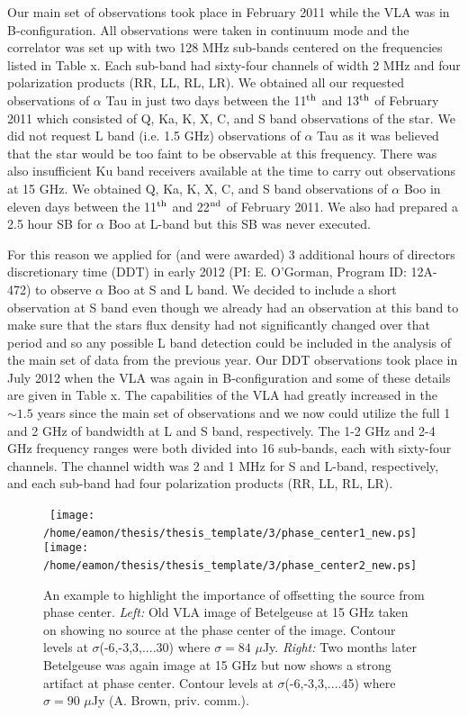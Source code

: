 Our main set of observations took place in February 2011 while the VLA was in B-configuration. All observations were taken in continuum mode and the correlator was set up with two 128 MHz sub-bands centered on the frequencies listed in Table x. Each sub-band had sixty-four channels of width 2 MHz and four polarization products (RR, LL, RL, LR). We obtained all our requested observations of $\alpha$ Tau in just two days between the 11$^{\rm{th}}$ and 13$^{\rm{th}}$ of February 2011 which consisted of Q, Ka, K, X, C, and S band observations of the star. We did not request L band (i.e. 1.5 GHz) observations of $\alpha$ Tau as it was believed that the star would be too faint to be observable at this frequency. There was also insufficient Ku band receivers available at the time to carry out observations at 15 GHz. We obtained Q, Ka, K, X, C, and S band observations of $\alpha$ Boo in eleven days between the 11$^{\rm{th}}$ and 22$^{\rm{nd}}$ of February 2011. We also had prepared a 2.5 hour SB for $\alpha$ Boo at L-band but this SB was never executed. 

For this reason we applied for (and were awarded) 3 additional hours of directors discretionary time (DDT) in early 2012 (PI: E. O'Gorman, Program ID: 12A-472) to observe $\alpha$ Boo at S and L band. We decided to include a short observation at S band even though we already had an observation at this band to make sure that the stars flux density had not significantly changed over that period and so any possible L band detection could be included in the analysis of the main set of data from the previous year. Our DDT observations took place in July 2012 when the VLA was again in B-configuration and some of these details are given in Table x. The capabilities of the VLA had greatly increased in the $\sim 1.5$ years since the main set of observations and we now could utilize the full 1 and 2 GHz of bandwidth at L and S band, respectively. The 1-2 GHz and 2-4 GHz frequency ranges were both divided into 16 sub-bands, each with sixty-four channels. The channel width was 2 and 1 MHz for S and L-band, respectively, and each sub-band had four polarization products (RR, LL, RL, LR).

\begin{figure}[hbt!]
\centering 
\mbox{
          \texttt{[image: /home/eamon/thesis/thesis\_template/3/phase\_center1\_new.ps]}
          \texttt{[image: /home/eamon/thesis/thesis\_template/3/phase\_center2\_new.ps]}
          }
\caption[Importance of offsetting source from phase center.]{An example to highlight the importance of offsetting the source from phase center. \textit{Left:} Old VLA image of Betelgeuse at 15 GHz taken on showing no source at the phase center of the image. Contour levels at $\sigma$(-6,-3,3,....30) where $\sigma = 84$ $\mu$Jy. \textit{Right:} Two months later Betelgeuse was again image at 15 GHz but now shows a strong artifact at phase center. Contour levels at $\sigma$(-6,-3,3,....45) where $\sigma = 90$ $\mu$Jy (A. Brown, priv. comm.).}
\label{}
\end{figure}

